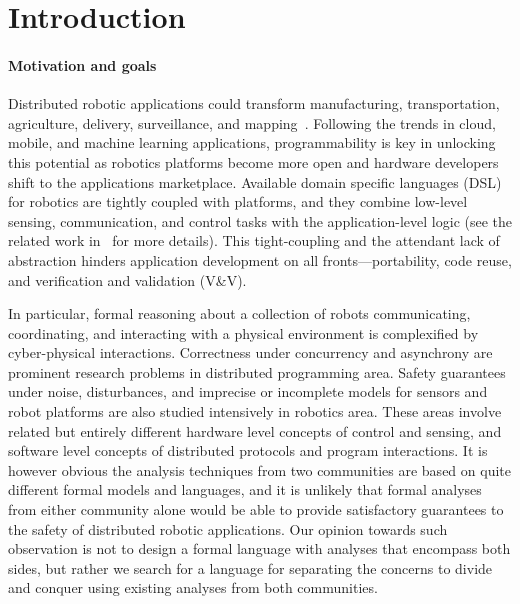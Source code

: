 \section{Introduction}
\label{sec:intro}

\paragraph{Motivation and goals}
Distributed robotic applications could transform manufacturing, transportation, agriculture, delivery, surveillance, and mapping~\cite{find}.
Following the trends in cloud, mobile, and machine learning applications, programmability is key in unlocking this potential
as robotics platforms become more open and hardware developers shift to the applications marketplace.
Available domain specific languages (DSL) for robotics are tightly coupled with platforms,
and they combine low-level sensing, communication, and control tasks with the application-level logic
(see the related work in~ for more details).
This tight-coupling and the attendant lack of abstraction hinders application development on all fronts---portability, code reuse, and verification and validation (V\&V).

In particular, formal reasoning about a collection of robots communicating, coordinating, and interacting with a physical environment
is complexified by cyber-physical interactions.
Correctness under concurrency and asynchrony are prominent research problems in distributed programming area.
Safety guarantees under noise, disturbances, and imprecise or incomplete models for sensors and robot platforms are also studied intensively in robotics area.
These areas involve related but entirely different hardware level concepts of control and sensing,
and software level concepts of distributed protocols and program interactions.
It is however obvious the analysis techniques from two communities are based on quite different formal models and languages,
and it is unlikely that formal analyses from either community alone would be able to provide satisfactory guarantees
to the safety of distributed robotic applications.
Our opinion towards such observation is not to design a formal language with analyses that encompass both sides,
but rather we search for a language for separating the concerns to divide and conquer using existing analyses from both communities.

